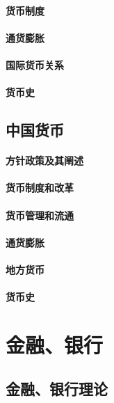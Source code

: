 \documentclass[UTF8]{../../RepresentationUniverse}
\begin{document}
    \subsubsection{货币制度}
    \subsubsection{通货膨胀}
    \subsubsection{国际货币关系}
    \subsubsection{货币史}
\section{中国货币}
    \subsubsection{方针政策及其阐述}
    \subsubsection{货币制度和改革}
    \subsubsection{货币管理和流通}
    \subsubsection{通货膨胀}
    \subsubsection{地方货币}
    \subsubsection{货币史}
 






\chapter{金融、银行}
\section{金融、银行理论}
\end{document}
